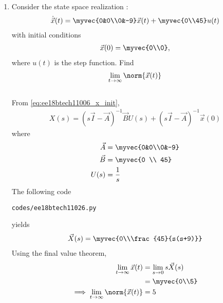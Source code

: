 \begin{enumerate}[label=\thesubsection.\arabic*.,ref=\thesubsection.\theenumi]

\item
Consider the state space realization : 
\begin{align}
  \dot{ \vec{x}}(t)=\myvec{0&0\\0&-9}\vec{x}(t) + \myvec{0\\45}u(t)   
\end{align}
with initial conditions 
\begin{align}
\vec{x}(0) = \myvec{0\\0},
\end{align}
 where $u(t)$ is the step function.  Find 
\begin{align}
\lim _ {t \to \infty}\norm{\vec{x}(t)}
\end{align}
\\
\solution
From \eqref{eq:ee18btech11006_x_init},
\begin{align}
     X(s)={(s\vec{I}-\vec{A})^{-1}}\vec{B} U(s)+ (s\vec{I}-\vec{A})^{-1}\vec{x}(0)
\end{align}
where
\begin{align}
     \vec{A} &=    \myvec{0&0\\0&-9}\\
     \vec{B} &=    \myvec{0 \\ 45}\\
U(s) &= \frac{1}{s}
\end{align}
%
The following code 
\begin{lstlisting}
codes/ee18btech11026.py
\end{lstlisting}
yields 
%
\begin{align}
   \vec{X}(s) = \myvec{0\\\frac{45}{s(s+9)}}    
\end{align}
Using the final value theorem,  
\begin{align}
\lim _ {t \to \infty}\vec{x}(t) &= \lim _ {s \to 0} s \vec{X}(s) 
\\
&= \myvec{0\\5} 
\\
\implies \lim _ {t \to \infty}\norm{\vec{x}(t)} &= 5
\end{align}


\end{enumerate}
